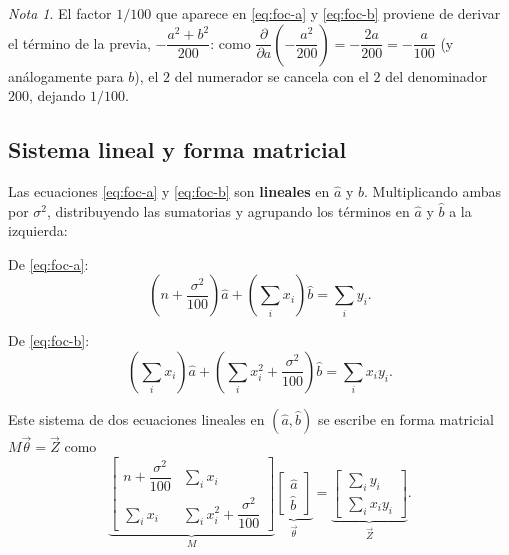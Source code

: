 \documentclass[11pt]{article}
\theoremstyle{remark}
\newtheorem*{nota}{Nota}
\begin{document}
\begin{nota}
El factor $1/100$ que aparece en \eqref{eq:foc-a} y \eqref{eq:foc-b} proviene
de derivar el término de la previa, $-\dfrac{a^2+b^2}{200}$: como
$\dfrac{\partial}{\partial a}\!\left(-\dfrac{a^2}{200}\right)=-\dfrac{2a}{200}
=-\dfrac{a}{100}$ (y análogamente para $b$), el $2$ del numerador se cancela
con el $2$ del denominador $200$, dejando $1/100$.
\end{nota}

\subsection{Sistema lineal y forma matricial}

Las ecuaciones \eqref{eq:foc-a} y \eqref{eq:foc-b} son \textbf{lineales} en
$\hat a$ y $\hat b$. Multiplicando ambas por $\sigma^2$, distribuyendo las
sumatorias y agrupando los términos en $\hat a$ y $\hat b$ a la izquierda:

De \eqref{eq:foc-a}:
\begin{equation}
\left(n+\frac{\sigma^2}{100}\right)\hat a + \left(\sum_{i}x_i\right)\hat b
= \sum_i y_i.
\label{eq:eq1}
\end{equation}

De \eqref{eq:foc-b}:
\begin{equation}
\left(\sum_i x_i\right)\hat a
+ \left(\sum_i x_i^2+\frac{\sigma^2}{100}\right)\hat b
= \sum_i x_iy_i.
\label{eq:eq2}
\end{equation}

Este sistema de dos ecuaciones lineales en $(\hat a,\hat b)$ se escribe en
forma matricial $M\vec\theta=\vec Z$ como
\begin{equation}
\underbrace{\begin{bmatrix}
n+\dfrac{\sigma^2}{100} & \displaystyle\sum_i x_i \\[10pt]
\displaystyle\sum_i x_i & \displaystyle\sum_i x_i^2+\dfrac{\sigma^2}{100}
\end{bmatrix}}_{M}
\underbrace{\begin{bmatrix}\hat a \\ \hat b\end{bmatrix}}_{\vec\theta}
=
\underbrace{\begin{bmatrix}
\displaystyle\sum_i y_i \\[6pt] \displaystyle\sum_i x_iy_i
\end{bmatrix}}_{\vec Z}.
\label{eq:sistema-matricial}
\end{equation}
\end{document}
